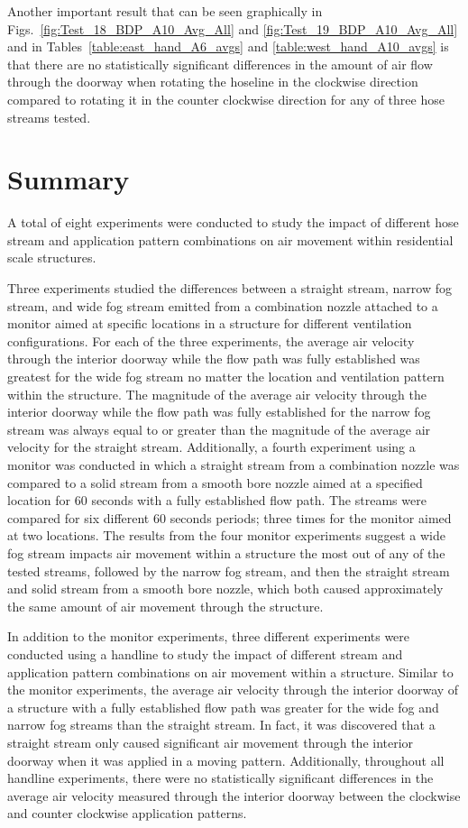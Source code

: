 \documentclass[12pt,oneside]{book}
\begin{document}
Another important result that can be seen graphically in Figs.~\ref{fig:Test_18_BDP_A10_Avg_All} and \ref{fig:Test_19_BDP_A10_Avg_All} and in Tables~\ref{table:east_hand_A6_avgs} and \ref{table:west_hand_A10_avgs} is that there are no statistically significant differences in the amount of air flow through the doorway when rotating the hoseline in the clockwise direction compared to rotating it in the counter clockwise direction for any of three hose streams tested. 


\chapter{Summary}
\label{chap:summary}

A total of eight experiments were conducted to study the impact of different hose stream and application pattern combinations on air movement within residential scale structures. 

Three experiments studied the differences between a straight stream, narrow fog stream, and wide fog stream emitted from a combination nozzle attached to a monitor aimed at specific locations in a structure for different ventilation configurations. For each of the three experiments, the average air velocity through the interior doorway while the flow path was fully established was greatest for the wide fog stream no matter the location and ventilation pattern within the structure. The magnitude of the average air velocity through the interior doorway while the flow path was fully established for the narrow fog stream was always equal to or greater than the magnitude of the average air velocity for the straight stream. Additionally, a fourth experiment using a monitor was conducted in which a straight stream from a combination nozzle was compared to a solid stream from a smooth bore nozzle aimed at a specified location for 60 seconds with a fully established flow path. The streams were compared for six different 60 seconds periods; three times for the monitor aimed at two locations. The results from the four monitor experiments suggest a wide fog stream impacts air movement within a structure the most out of any of the tested streams, followed by the narrow fog stream, and then the straight stream and solid stream from a smooth bore nozzle, which both caused approximately the same amount of air movement through the structure.

In addition to the monitor experiments, three different experiments were conducted using a handline to study the impact of different stream and application pattern combinations on air movement within a structure. Similar to the monitor experiments, the average air velocity through the interior doorway of a structure with a fully established flow path was greater for the wide fog and narrow fog streams than the straight stream. In fact, it was discovered that a straight stream only caused significant air movement through the interior doorway when it was applied in a moving pattern. Additionally, throughout all handline experiments, there were no statistically significant differences in the average air velocity measured through the interior doorway between the clockwise and counter clockwise application patterns.
\end{document}
